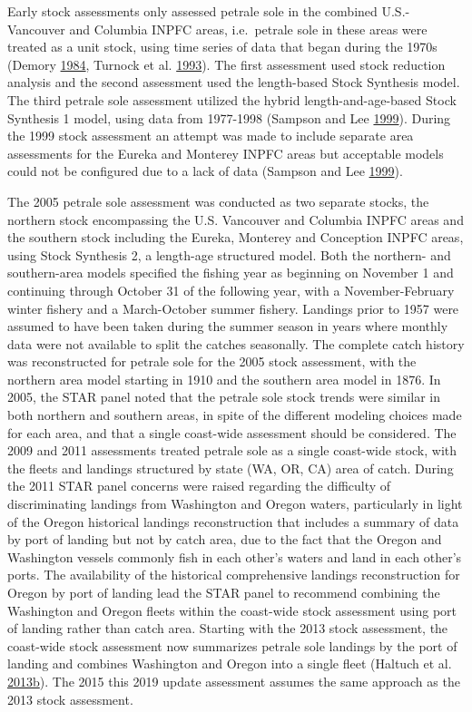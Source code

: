\documentclass[12pt,]{article}
\begin{document}
Early stock assessments only assessed petrale sole in the combined
U.S.-Vancouver and Columbia INPFC areas, i.e.~petrale sole in these
areas were treated as a unit stock, using time series of data that began
during the 1970s (Demory
\protect\hyperlink{ref-demory_progress_1984}{1984}, Turnock et al.
\protect\hyperlink{ref-turnock_status_1993}{1993}). The first assessment
used stock reduction analysis and the second assessment used the
length-based Stock Synthesis model. The third petrale sole assessment
utilized the hybrid length-and-age-based Stock Synthesis 1 model, using
data from 1977-1998 (Sampson and Lee
\protect\hyperlink{ref-sampson_assessment_1999}{1999}). During the 1999
stock assessment an attempt was made to include separate area
assessments for the Eureka and Monterey INPFC areas but acceptable
models could not be configured due to a lack of data (Sampson and Lee
\protect\hyperlink{ref-sampson_assessment_1999}{1999}).

The 2005 petrale sole assessment was conducted as two separate stocks,
the northern stock encompassing the U.S. Vancouver and Columbia INPFC
areas and the southern stock including the Eureka, Monterey and
Conception INPFC areas, using Stock Synthesis 2, a length-age structured
model. Both the northern- and southern-area models specified the fishing
year as beginning on November 1 and continuing through October 31 of the
following year, with a November-February winter fishery and a
March-October summer fishery. Landings prior to 1957 were assumed to
have been taken during the summer season in years where monthly data
were not available to split the catches seasonally. The complete catch
history was reconstructed for petrale sole for the 2005 stock
assessment, with the northern area model starting in 1910 and the
southern area model in 1876. In 2005, the STAR panel noted that the
petrale sole stock trends were similar in both northern and southern
areas, in spite of the different modeling choices made for each area,
and that a single coast-wide assessment should be considered. The 2009
and 2011 assessments treated petrale sole as a single coast-wide stock,
with the fleets and landings structured by state (WA, OR, CA) area of
catch. During the 2011 STAR panel concerns were raised regarding the
difficulty of discriminating landings from Washington and Oregon waters,
particularly in light of the Oregon historical landings reconstruction
that includes a summary of data by port of landing but not by catch
area, due to the fact that the Oregon and Washington vessels commonly
fish in each other's waters and land in each other's ports. The
availability of the historical comprehensive landings reconstruction for
Oregon by port of landing lead the STAR panel to recommend combining the
Washington and Oregon fleets within the coast-wide stock assessment
using port of landing rather than catch area. Starting with the 2013
stock assessment, the coast-wide stock assessment now summarizes petrale
sole landings by the port of landing and combines Washington and Oregon
into a single fleet (Haltuch et al.
\protect\hyperlink{ref-haltuch_status_2013}{2013}\protect\hyperlink{ref-haltuch_status_2013}{b}).
The 2015 this 2019 update assessment assumes the same approach as the
2013 stock assessment.
\end{document}
